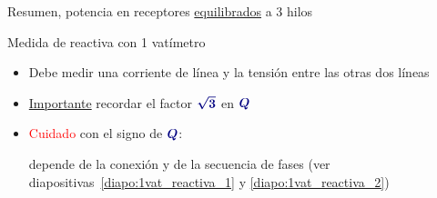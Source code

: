 \documentclass[aspectratio=169, usenames,svgnames,dvipsnames]{beamer}
\begin{document}
\begin{frame}{Resumen, \hspace{3mm}potencia en receptores \underline{equilibrados} a 3 hilos}
{\begin{minipage}{0.42\linewidth}
        \begin{center}
            Medida de \alert{reactiva} con \alert{1 vatímetro}
            \vspace{1mm}
        \end{center}            
    \end{minipage} }
    \begin{adjustwidth}{0.5cm}{}
    \begin{itemize}
        \normalsize

        \vspace{1mm}
        \item Debe medir \alert{una corriente de línea} y la \alert{tensión entre las otras dos} líneas

        \vspace{2mm}
        \item \underline{Importante} recordar el factor ${\boldsymbol{\color{blue!50!black} \sqrt3}}$ en ${\boldsymbol{\color{blue!50!black} Q}}$ 

        \vspace{2mm}
        \item \textcolor{red}{Cuidado} con el \alert{signo} de ${\boldsymbol{\color{blue!50!black} Q}}$\hspace{0.2mm}: 

        \vspace{1mm}
        depende de la \alert{conexión} y de la \alert{secuencia de fases} \hspace{3mm}(ver diapositivas~\ref{diapo:1vat_reactiva_1} y \ref{diapo:1vat_reactiva_2})
    \end{itemize}
    \end{adjustwidth}
\end{frame}

\end{document}
